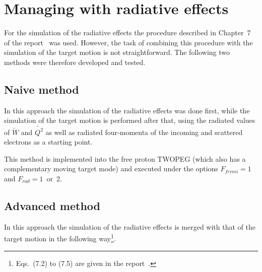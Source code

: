 \newpage
\chapter{Managing with radiative effects}
\label{sect:rad_eff}

\mbox{}\vspace{-\baselineskip}


For the simulation of the radiative effects the procedure described in Chapter~7 of the report~\cite{twopeg} was used. However, the task of combining this procedure with the simulation of the target motion is not straightforward. The following two methods were therefore developed and tested.


\section{ Naive method}

In this approach the simulation of the radiative effects was done first, while the simulation of the target motion is performed after that, using the radiated values of $\widetilde{W}$ and $\widetilde{Q^2}$ as well as radiated four-momenta of the incoming and scattered electrons as a starting point.


This method is implemented into the free proton TWOPEG (which also has a complementary moving target mode) and executed under the options $F_{fermi}=1$ and $F_{rad}=1$~or~2.

\section{Advanced method}

In this approach the simulation of the radiative effects is merged with that of the target motion in the following way\footnote[1]{Eqs.~(7.2) to (7.5) are given in the report~\cite{twopeg}.}.


